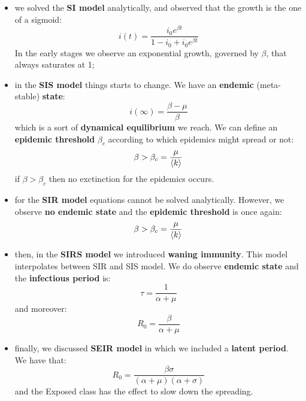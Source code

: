 \documentclass[../main/main.tex]{subfiles}
\begin{document}
\begin{itemize}
\item we solved the \textbf{SI model} analytically, and observed that the growth is the one of a sigmoid:
\begin{equation*}
  i(t) = \frac{i_0 e^{\beta t} }{1-i_0 + i_0 e^{\beta t} }
\end{equation*}
In the early stages we observe an exponential growth, governed by \( \beta  \), that always saturates at 1;

\item in the \textbf{SIS model} things starts to change. We have an \textbf{endemic} (meta-stable) \textbf{state}:
\begin{equation*}
  i(\infty) = \frac{\beta -\mu }{\beta }
\end{equation*}
which is a sort of \textbf{dynamical equilibrium} we reach. We can define an \textbf{epidemic threshold} $\beta_c$ according to which epidemics might spread or not:
\begin{equation*}
  \beta > \beta _c = \frac{\mu }{\expval{k} }
\end{equation*}
if $\beta> \beta_c$ then no exctinction for the epidemics occurs.

\item for the \textbf{SIR model} equations cannot be solved analytically. However, we observe \textbf{no endemic state} and the \textbf{epidemic threshold} is once again:
\begin{equation*}
  \beta > \beta _c = \frac{\mu }{\expval{k} }
\end{equation*}

\item then, in the \textbf{SIRS model} we introduced \textbf{waning immunity}. This model interpolates between SIR and SIS model. We do observe \textbf{endemic state} and the \textbf{infectious period} is:
\begin{equation*}
  \tau = \frac{1}{\alpha + \mu }
\end{equation*}
and moreover:
 \begin{equation*}
   R_0 = \frac{\beta }{\alpha + \mu }
 \end{equation*}

\item finally, we discussed \textbf{SEIR model} in which we included a \textbf{latent period}. We have that:
\begin{equation*}
  R_0 = \frac{\beta \sigma }{(\alpha + \mu )(\alpha +\sigma )}
\end{equation*}
and the Exposed class has the effect to slow down the spreading.
\end{itemize}
\end{document}
